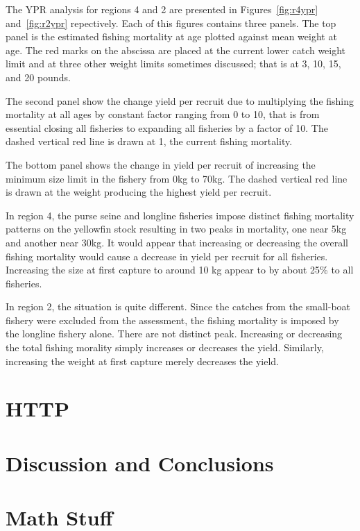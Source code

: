 \documentclass[12pt,letterpaper]{article}
\newcommand\help[1]{\color{Magenta}{\it #1 }\normalcolor}
\begin{document}
The YPR analysis for regions 4 and 2 are
presented in Figures~\ref{fig:r4ypr} and~\ref{fig:r2ypr} repectively.
Each of this figures contains three panels. \label{pp:what}
The top panel is the estimated fishing mortality at age plotted
against mean weight at age. The red marks on the abscissa are placed at
the current lower catch weight limit and at three other
weight limits sometimes discussed; 
that is at 3, 10, 15, and 20 pounds.

The second panel show the change yield per recruit due to multiplying
the fishing mortality at all ages by constant factor ranging from 0 to
10, that is from essential closing all fisheries to expanding all
fisheries by a factor of 10. 
The dashed vertical red line is drawn at 1, the current fishing mortality.

The bottom panel shows the change in yield per recruit of increasing
the minimum size limit in the fishery from 0kg to 70kg. 
The dashed vertical red line is drawn at the weight producing the
highest yield per recruit.

In region 4, the purse seine and longline fisheries impose distinct fishing
mortality patterns on the yellowfin stock resulting in two peaks in
mortality, one near 5kg and another near 30kg.
It would appear that increasing or decreasing the overall fishing
mortality would cause a decrease in yield per recruit for all
fisheries.
\help{Or this may be an artifact of the math.}
Increasing the size at first capture to around 10 kg appear to by
about 25\% to all fisheries.

In region 2, the situation is quite different. Since the catches from
the small-boat fishery were excluded from the assessment, the fishing
mortality is imposed by the longline fishery alone. There are not
distinct peak.
Increasing or decreasing the total fishing morality simply increases
or decreases the yield.
Similarly, increasing the weight at first capture merely decreases the
yield.

\section*{HTTP}\help{Working on it.}

\section*{Discussion and Conclusions}\help{Working on it.}

\section*{Math Stuff}\help{Working on it.}
\end{document}
